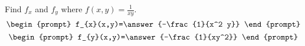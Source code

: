 \documentclass{ximera}
\author{David Guichard \and Neal Koblitz \and H. Jerome Keisler \and Albert Scheller \and Barry Balof \and Mike Wills \and Matthew Carr}
\begin{document}
\begin{exercise}




Find $f_x$ and $f_y$ where $f(x,y)=\frac{1}{xy}$.
\[
\begin{prompt}
f_{x}(x,y)=\answer{-\frac{1}{x^2 y}}
\end{prompt}
\]
\[
\begin{prompt}
f_{y}(x,y)=\answer{-\frac{1}{xy^2}}
\end{prompt}
\]

\end{exercise}
\end{document}
